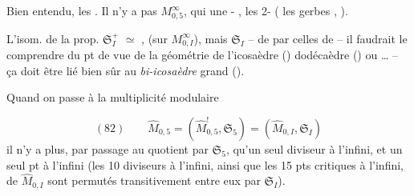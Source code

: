 \documentclass[11pt,a4paper]{article}
\begin{document}
Bien entendu, les     . Il n'y a pas     \ill{}   $M^{\infty}_{0,5}$, qui  \struck{\ill{}} \add{\ill{}}   une - \ill{}  ,   les 2- \ill{} ( les gerbes \ill{} ,    ).

L'isom. de la prop.   \ill{}   $\mathfrak{S}^{+}_{I}$ ${\simeq}$ , (sur $M^{\infty}_{0,I}$), mais $\mathfrak{S}_I$   --   de \ill{} par celles de \ill{} -- il faudrait le comprendre du pt de vue de la géométrie de l'icosaèdre ()  \ill{} dodécaèdre () ou … -- ça doit être lié bien sûr au \emph{bi-icosaèdre} grand ().

Quand on passe à la multiplicité modulaire

\[
(82)\qquad \widehat{M}_{0,5} = (\widehat{M}^{!}_{0,5}, \mathfrak{S}_5) = (\widehat{M}_{0,I}, \mathfrak{S}_I)
\]
il n'y a plus, par \og passage au quotient\fg{} par $\mathfrak{S}_5$, qu'un seul diviseur à l'infini, et un seul pt  à l'infini (les 10 diviseurs à l'infini, ainsi que les 15 pts critiques à l'infini, de $\widehat{M}_{0,I}$ sont permutés transitivement entre eux par $\mathfrak{S}_I$).
\end{document}
